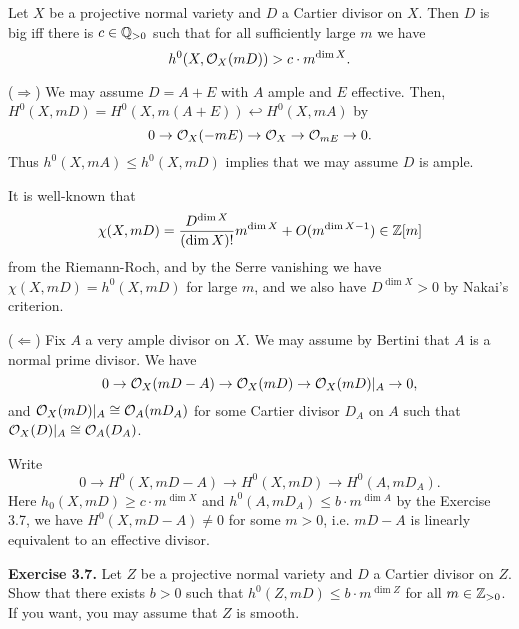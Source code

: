 \documentclass{../../small}
\begin{document}
\begin{prop}
Let $X$ be a projective normal variety and $D$ a Cartier divisor on $X$.
Then $D$ is big iff there is $c\in\mathbb{Q}_{>0}$ such that for all sufficiently large $m$ we have
\[h^0(X,\mathcal{O}_X(mD))>c\cdot m^{\dim X}.\]
\end{prop}
\begin{pf}
($\Rightarrow$)
We may assume $D=A+E$ with $A$ ample and $E$ effective.
Then, $H^0(X,mD)=H^0(X,m(A+E))\hookleftarrow H^0(X,mA)$ by
\[0\to \mathcal{O}_X(-mE)\to\mathcal{O}_X\to\mathcal{O}_{mE}\to0.\]
Thus $h^0(X,mA)\le h^0(X,mD)$ implies that we may assume $D$ is ample.

It is well-known that
\[\chi(X,mD)=\frac{D^{\dim X}}{(\dim X)!}m^{\dim X}+O(m^{\dim X-1})\in\mathbb{Z}[m]\]
from the Riemann-Roch, and by the Serre vanishing we have $\chi(X,mD)=h^0(X,mD)$ for large $m$, and we also have $D^{\dim X}>0$ by Nakai's criterion.

($\Leftarrow$)
Fix $A$ a very ample divisor on $X$.
We may assume by Bertini that $A$ is a normal prime divisor.
We have
\[0\to\mathcal{O}_X(mD-A)\to\mathcal{O}_X(mD)\to\mathcal{O}_X(mD)|_A\to0,\]
and $\mathcal{O}_X(mD)|_A\cong\mathcal{O}_A(mD_A)$ for some Cartier divisor $D_A$ on $A$ such that $\mathcal{O}_X(D)|_A\cong\mathcal{O}_A(D_A)$.

Write
\[0\to H^0(X,mD-A)\to H^0(X,mD)\to H^0(A,mD_A).\]
Here $h_0(X,mD)\ge c\cdot m^{\dim X}$ and $h^0(A,mD_A)\le b\cdot m^{\dim A}$ by the Exercise 3.7, we have $H^0(X,mD-A)\ne0$ for some $m>0$, i.e. $mD-A$ is linearly equivalent to an effective divisor.
\end{pf}

\textbf{Exercise 3.7.} Let $Z$ be a projective normal variety and $D$ a Cartier divisor on $Z$.
Show that there exists $b>0$ such that $h^0(Z,mD)\le b\cdot m^{\dim Z}$ for all $m\in\mathbb{Z}_{>0}$.
If you want, you may assume that $Z$ is smooth.
\end{document}

